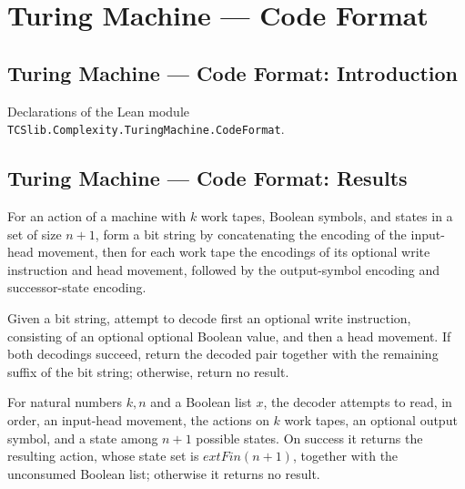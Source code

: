 \section{Turing Machine --- Code Format}
\subsection*{Turing Machine --- Code Format: Introduction}

Declarations of the Lean module \texttt{TCSlib.Complexity.TuringMachine.CodeFormat}.

\subsection*{Turing Machine --- Code Format: Results}

\begin{definition}
\label{Turing.actionBitsK}
\leanok
{}
For an action of a machine with $k$ work tapes, Boolean symbols, and states in a set of
size $n+1$, form a bit string by concatenating the encoding of the input-head movement,
then for each work tape the encodings of its optional write instruction and head
movement, followed by the output-symbol encoding and successor-state encoding.
\end{definition}

\begin{definition}
\label{Turing.codeReadWork}
\leanok
{}
Given a bit string, attempt to decode first an optional write instruction, consisting of
an optional optional Boolean value, and then a head movement. If both decodings succeed,
return the decoded pair together with the remaining suffix of the bit string; otherwise,
return no result.
\end{definition}

\begin{definition}
\label{Turing.codeReadActionK}
\leanok
{}
For natural numbers $k,n$ and a Boolean list $x$, the decoder attempts to read, in
order, an input-head movement, the actions on $k$ work tapes, an optional output symbol,
and a state among $n+1$ possible states. On success it returns the resulting action,
whose state set is $	ext{Fin}(n+1)$, together with the unconsumed Boolean list;
otherwise it returns no result.
\end{definition}

